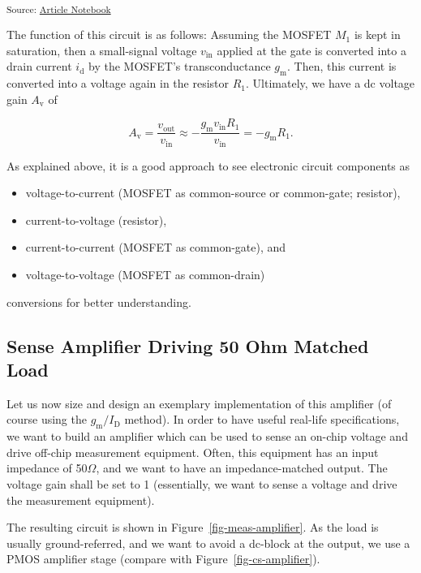 \documentclass[
  a4paper,
  DIV=11,
  numbers=noendperiod]{scrartcl}
\providecommand{\tightlist}{%
  \setlength{\itemsep}{0pt}\setlength{\parskip}{0pt}}\usepackage{longtable,booktabs,array}
\begin{document}
\textsubscript{Source:
\href{https://iic-jku.github.io/analog-circuit-design/index.qmd.html}{Article
Notebook}}

The function of this circuit is as follows: Assuming the MOSFET \(M_1\)
is kept in saturation, then a small-signal voltage \(v_\mathrm{in}\)
applied at the gate is converted into a drain current \(i_\mathrm{d}\)
by the MOSFET's transconductance \(g_\mathrm{m}\). Then, this current is
converted into a voltage again in the resistor \(R_1\). Ultimately, we
have a dc voltage gain \(A_\mathrm{v}\) of

\[
A_\mathrm{v} = \frac{v_\mathrm{out}}{v_\mathrm{in}} \approx - \frac{g_\mathrm{m}v_\mathrm{in} R_1}{v_\mathrm{in}} = - g_\mathrm{m}R_1.
\]

As explained above, it is a good approach to see electronic circuit
components as

\begin{itemize}
\tightlist
\item
  voltage-to-current (MOSFET as common-source or common-gate; resistor),
\item
  current-to-voltage (resistor),
\item
  current-to-current (MOSFET as common-gate), and
\item
  voltage-to-voltage (MOSFET as common-drain)
\end{itemize}

conversions for better understanding.

\subsection{Sense Amplifier Driving 50 Ohm Matched
Load}\label{sense-amplifier-driving-50-ohm-matched-load}

Let us now size and design an exemplary implementation of this amplifier
(of course using the \(g_\mathrm{m}/I_\mathrm{D}\) method). In order to
have useful real-life specifications, we want to build an amplifier
which can be used to sense an on-chip voltage and drive off-chip
measurement equipment. Often, this equipment has an input impedance of
50\(\Omega\), and we want to have an impedance-matched output. The
voltage gain shall be set to 1 (essentially, we want to sense a voltage
and drive the measurement equipment).

The resulting circuit is shown in Figure~\ref{fig-meas-amplifier}. As
the load is usually ground-referred, and we want to avoid a dc-block at
the output, we use a PMOS amplifier stage (compare with
Figure~\ref{fig-cs-amplifier}).
\end{document}
